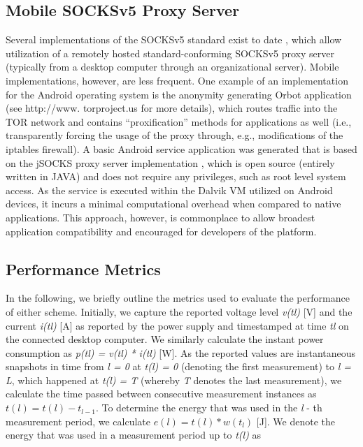 \subsection*{Mobile SOCKSv5 Proxy Server}
Several implementations of the SOCKSv5 standard 
exist to date \cite{rfc1928}, which allow utilization of a remotely hosted
standard-conforming SOCKSv5 proxy server (typically from
a desktop computer through an organizational server). Mobile
implementations, however, are less frequent. One example
of an implementation for the Android operating system is
the anonymity generating Orbot application (see http://www.
torproject.us for more details), which routes traffic into the TOR network and contains “proxification” methods for applications as well (i.e., transparently forcing the usage of the proxy through, e.g., modifications of the iptables firewall). A basic Android service application was generated that is based on the jSOCKS proxy server implementation \cite{kouzoubov2011}, which is open source
(entirely written in JAVA) and does not require any
privileges, such as root level system access. As the service is executed within the Dalvik VM utilized on Android devices, it incurs a minimal computational overhead when compared to native applications. This approach, however, is commonplace to allow broadest application compatibility and encouraged for developers of the platform.

\subsection*{Performance Metrics}
In the following, we briefly outline the metrics used to evaluate the performance of either scheme. Initially, we capture the reported voltage level \textit{v(tl)} [V] and the current \textit{i(tl)} [A] as reported by the power supply and timestamped at time \textit{tl}
on the connected desktop computer. We similarly calculate
the instant power consumption as \textit{p(tl) = v(tl) * i(tl)} [W].
As the reported values are instantaneous snapshots in time
from \textit{l = 0} at \textit{t(l) = 0} (denoting the first measurement) to
\textit{l = L}, which happened at \textit{t(l) = T} (whereby \textit{T} denotes
the last measurement), we calculate the time passed between
consecutive measurement instances as $t(l) = t(l) - t_{l-1}$. To
determine the energy that was used in the \textit{l} - th measurement
period, we calculate $e(l) = t(l) * w(t_l)$ [J]. We denote the
energy that was used in a measurement period up to \textit{t(l)} as

